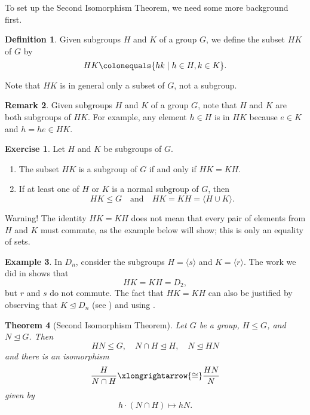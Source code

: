 \documentclass[12pt]{report}
\newtheorem{theorem}{Theorem}[chapter]
\numberwithin{equation}{section}
\numberwithin{theorem}{chapter}
\theoremstyle{definition}
\newtheorem{definition}[theorem]{Definition}
\newtheorem{example}[theorem]{Example}
\newtheorem{exercise}{Exercise}
\newtheorem*{basic properties}{Basic Properties}
\newtheorem*{Important Remark}{Important Remark}
\newtheorem{remark}[theorem]{Remark}
\begin{document}
\vspace{1em}

To set up the Second Isomorphism Theorem, we need some more background first.

\begin{definition}
Given subgroups $H$ and $K$ of a group $G$, we define the subset $HK$ of $G$ by
$$HK \colonequals \{hk \mid h \in H, k\in K\}.$$	
\end{definition}

Note that $HK$ is in general only a subset of $G$, not a subgroup.


\begin{remark}
	Given subgroups $H$ and $K$ of a group $G$, note that $H$ and $K$ are both subgroups of $HK$. For example, any element $h \in H$ is in $HK$ because $e \in K$ and $h = he \in HK$.
\end{remark}


\begin{exercise}\label{exercise HK=KH}
Let $H$ and $K$ be subgroups of $G$.	
\begin{enumerate}[leftmargin=10pt]
\item The subset $HK$ is a subgroup of $G$ if and only if $HK=KH$.
\item If at least one of $H$ or $K$ is a normal subgroup of $G$, then 
$$HK\leq G \quad \textrm{and} \quad HK=KH=\langle H\cup K\rangle.$$
\end{enumerate}
\end{exercise}

Warning! The identity $HK=KH$ does not mean that every pair of elements from $H$ and $K$ must commute, as the example below will show; this is only an equality of sets.

\begin{example}
In $D_{n}$, consider the subgroups $H=\langle s\rangle$ and $K=\langle r\rangle$. The work we did in  shows that 
$$HK=KH=D_{2},$$ 
but $r$ and $s$ do not commute. The fact that $HK=KH$ can also be justified by observing that $K\trianglelefteq D_{n}$ (see ) and using .
\end{example}


\begin{theorem}[Second Isomorphism Theorem]\label{Second Isomorphism Theorem}
Let $G$ be a group, $H \leq G$, and $N \trianglelefteq G$. Then 
$$HN \leq G, \quad N \cap H \trianglelefteq H, \quad N \trianglelefteq HN$$ 
and there is an isomorphism
$$\frac{H}{N \cap H} \xlongrightarrow{\cong} \frac{HN}{N}$$
given by 
$$h \cdot (N \cap H) \mapsto hN.$$
\end{theorem}
\end{document}
